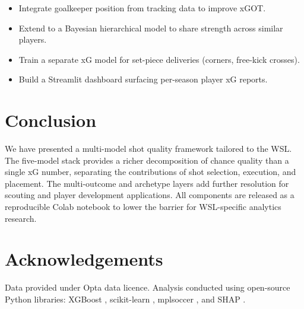 \documentclass[12pt,a4paper]{article}
\begin{document}
\begin{itemize}
    \item Integrate goalkeeper position from tracking data to improve xGOT.
    \item Extend to a Bayesian hierarchical model to share strength across similar players.
    \item Train a separate xG model for set-piece deliveries (corners, free-kick crosses).
    \item Build a Streamlit dashboard surfacing per-season player xG reports.
\end{itemize}

\section{Conclusion}
\label{sec:conclusion}

We have presented a multi-model shot quality framework tailored to the WSL. The five-model stack provides a richer decomposition of chance quality than a single xG number, separating the contributions of shot selection, execution, and placement. The multi-outcome and archetype layers add further resolution for scouting and player development applications. All components are released as a reproducible Colab notebook to lower the barrier for WSL-specific analytics research.

\section*{Acknowledgements}

Data provided under Opta data licence. Analysis conducted using open-source Python libraries: XGBoost \citep{chen2016xgboost}, scikit-learn \citep{pedregosa2011}, mplsoccer \citep{mplsoccer}, and SHAP \citep{lundberg2017}.
\end{document}
